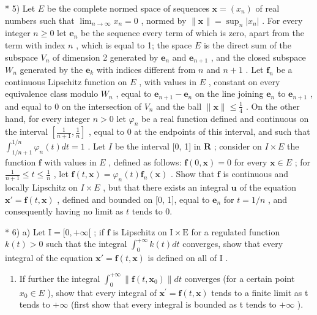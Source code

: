 * 5) Let \(E\) be the complete normed space of sequences \(\mathbf{x} = (x_{n})\) of real numbers such that \(\lim_{n\to \infty}x_n = 0\) , normed by \(\| \mathbf{x}\| = \sup_n|x_n|\) . For every integer \(n\geqslant 0\) let \(\mathbf{e}_n\) be the sequence every term of which is zero, apart from the term with index \(n\) , which is equal to 1; the space \(E\) is the direct sum of the subspace \(V_{n}\) of dimension 2 generated by \(\mathbf{e}_n\) and \(\mathbf{e}_{n + 1}\) , and the closed subspace \(W_{n}\) generated by the \(\mathbf{e}_k\) with indices different from \(n\) and \(n + 1\) . Let \(\mathbf{f}_n\) be a continuous Lipschitz function on \(E\) , with values in \(E\) , constant on every equivalence class modulo \(W_{n}\) , equal to \(\mathbf{e}_{n + 1} - \mathbf{e}_n\) on the line joining \(\mathbf{e}_n\) to \(\mathbf{e}_{n + 1}\) , and equal to 0 on the intersection of \(V_{n}\) and the ball \(\| \mathbf{x}\| \leqslant \frac{1}{4}\) . On the other hand, for every integer \(n > 0\) let \(\varphi_{n}\) be a real function defined and continuous on the interval \(\left[\frac{1}{n + 1},\frac{1}{n}\right]\) , equal to 0 at the endpoints of this interval, and such that \(\int_{1 / n + 1}^{1 / n}\varphi_n(t)dt = 1\) . Let \(I\) be the interval {[}0, 1{]} in \(\mathbf{R}\) ; consider on \(I\times E\) the function \(\mathbf{f}\) with values in \(E\) , defined as follows: \(\mathbf{f}(0,\mathbf{x}) = 0\) for every \(\mathbf{x}\in E\) ; for \(\frac{1}{n + 1}\leqslant t\leqslant \frac{1}{n}\) , let \(\mathbf{f}(t,\mathbf{x}) = \varphi_n(t)\mathbf{f}_n(\mathbf{x})\) . Show that \(\mathbf{f}\) is continuous and locally Lipschitz on \(I\times E\) , but that there exists an integral \(\mathbf{u}\) of the equation \(\mathbf{x}' = \mathbf{f}(t,\mathbf{x})\) , defined and bounded on {[}0, 1{]}, equal to \(\mathbf{e}_n\) for \(t = 1 / n\) , and consequently having no limit as \(t\) tends to 0.

* 6) a) Let \(\mathrm{I} = [0, +\infty[\) ; if \(\mathbf{f}\) is Lipschitz on \(\mathrm{I} \times \mathrm{E}\) for a regulated function \(k(t) > 0\) such that the integral \(\int_0^{+\infty} k(t) dt\) converges, show that every integral of the equation \(\mathbf{x}' = \mathbf{f}(t, \mathbf{x})\) is defined on all of \(\mathrm{I}\) .

\begin{enumerate}
\def\labelenumi{\alph{enumi})}
\setcounter{enumi}{1}
\tightlist
\item
  If further the integral \(\int_{0}^{+\infty}\|\mathbf{f}(t,\mathbf{x}_{0})\|dt\) converges (for a certain point \(x_{0}\in E\) ), show that every integral of \(\mathbf{x}^{\prime}=\mathbf{f}(t,\mathbf{x})\) tends to a finite limit as t tends to \(+\infty\) (first show that every integral is bounded as t tends to \(+\infty\) ).
\end{enumerate}

